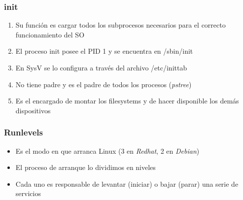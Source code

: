 \begin{frame}
  \frametitle{\textbf{init}}
  \begin{enumerate}
	\item Su función es cargar todos los subprocesos necesarios para el correcto funcionamiento del SO
	\item El proceso init posee el PID 1 y se encuentra en /sbin/init
	\item En SysV se lo configura a través del archivo /etc/inittab
	\item No tiene padre y es el padre de todos los procesos (\textit{pstree})
	\item Es el encargado de montar los filesystems y de hacer disponible los demás dispositivos
  \end{enumerate}
\end{frame}

\begin{frame}
  \frametitle{Runlevels}
  \begin{itemize}
	  	\item Es el modo en que arranca Linux (3 en \emph{Redhat}, 2 en \emph{Debian})

	  	\item El proceso de arranque lo dividimos en niveles

	  	\item Cada uno es responsable de levantar (iniciar) o bajar (parar) una serie de servicios
  \end{itemize}
\end{frame}

